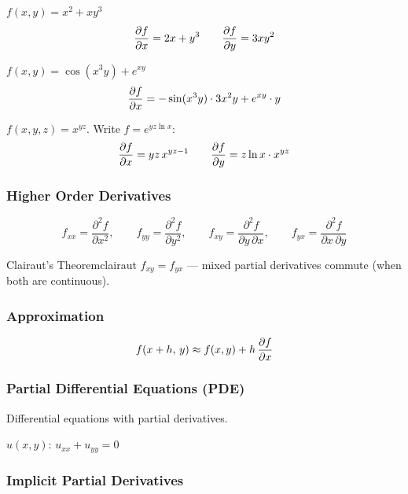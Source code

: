 \begin{example}
  $f(x,y) = x^{2}+xy^{3}$
  \[
    \frac{\partial f}{\partial x} = 2x+y^{3}
    \qquad
    \frac{\partial f}{\partial y} = 3xy^{2}
  \]
\end{example}

\begin{example}
  $f(x,y) = \cos(x^{3}y)+e^{xy}$
  \[
    \frac{\partial f}{\partial x}
    = -\sin(x^{3}y)\cdot 3x^{2}y + e^{xy}\cdot y
  \]
\end{example}

\begin{example}
  $f(x,y,z) = x^{yz}$. \; Write $f = e^{yz\ln x}$:
  \[
    \frac{\partial f}{\partial x} = yz\,x^{yz-1}
    \qquad
    \frac{\partial f}{\partial y} = z\ln x\cdot x^{yz}
  \]
\end{example}

\subsubsection{Higher Order Derivatives}

\[
  f_{xx} = \frac{\partial^{2}f}{\partial x^{2}}, \qquad
  f_{yy} = \frac{\partial^{2}f}{\partial y^{2}}, \qquad
  f_{xy} = \frac{\partial^{2}f}{\partial y\,\partial x}, \qquad
  f_{yx} = \frac{\partial^{2}f}{\partial x\,\partial y}
\]

\begin{theorem}{Clairaut's Theorem}{clairaut}
  $f_{xy}=f_{yx}$ — mixed partial derivatives commute (when both are continuous).
\end{theorem}

\subsubsection{Approximation}

\[
  f(x+h,\,y) \approx f(x,y) + h\,\frac{\partial f}{\partial x}
\]

\subsubsection{Partial Differential Equations (PDE)}

Differential equations with partial derivatives.

\begin{example}
  $u(x,y)$: \; $u_{xx}+u_{yy}=0$
\end{example}

\subsubsection{Implicit Partial Derivatives}

